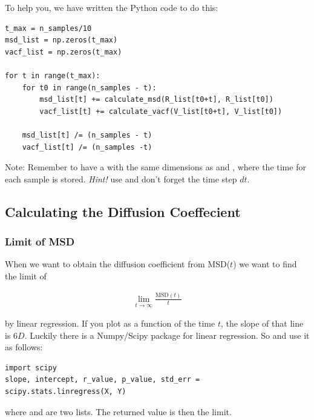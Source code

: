 \documentclass{article}
\begin{document}
To help you, we have written the Python code to do this:

\begin{lstlisting}
t_max = n_samples/10
msd_list = np.zeros(t_max)
vacf_list = np.zeros(t_max)

for t in range(t_max):
    for t0 in range(n_samples - t):
        msd_list[t] += calculate_msd(R_list[t0+t], R_list[t0])
        vacf_list[t] += calculate_vacf(V_list[t0+t], V_list[t0])

    msd_list[t] /= (n_samples - t)
    vacf_list[t] /= (n_samples -t)
\end{lstlisting}

Note: Remember to have a   with
the same dimensions as  and , where the time for each sample is stored.
\emph{Hint!} use
 and don't forget the time step $dt$.

\subsection{Calculating the Diffusion Coeffecient}

\subsubsection{Limit of MSD}

When we want to obtain the diffusion coefficient from MSD($t$) we
want to find the limit of

\begin{align}
    \lim_{t\rightarrow \infty} \frac{\mathrm{MSD}(t)}{t}
\end{align}

by linear regression. If you plot  as a function of the time $t$, the slope of that line is $6D$. 
Luckily there is a Numpy/Scipy package for linear regression.
So  and use it as follows: 

\begin{lstlisting}
import scipy
slope, intercept, r_value, p_value, std_err = scipy.stats.linregress(X, Y)
\end{lstlisting}

where  and  are two lists. The returned value  is then the limit.
\end{document}
